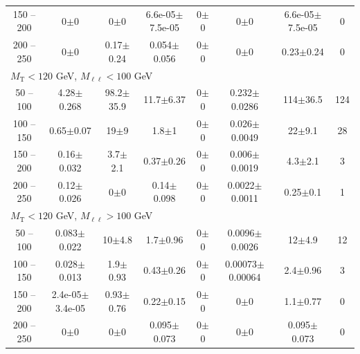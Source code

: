 \begin{landscape}
\begin{table}
\begin{center}
\begin{tabular}{| c | c c c c c c  c | }
150 -- 200&0$\pm$0&0$\pm$0&6.6e-05$\pm$7.5e-05&0$\pm$0&0$\pm$0&6.6e-05$\pm$7.5e-05&0\\
200 -- 250&0$\pm$0&0.17$\pm$0.24&0.054$\pm$0.056&0$\pm$0&0$\pm$0&0.23$\pm$0.24&0\\
\hline\hline
\multicolumn{8}{l}{$M_{\text{T}} < 120$ GeV, $M_{\ell\ell} < 100$ GeV}\\\hline\hline
50 -- 100&4.28$\pm$0.268&98.2$\pm$35.9&11.7$\pm$6.37&0$\pm$0&0.232$\pm$0.0286&114$\pm$36.5&124\\
100 -- 150&0.65$\pm$0.07&19$\pm$9&1.8$\pm$1&0$\pm$0&0.026$\pm$0.0049&22$\pm$9.1&28\\
150 -- 200&0.16$\pm$0.032&3.7$\pm$2.1&0.37$\pm$0.26&0$\pm$0&0.006$\pm$0.0019&4.3$\pm$2.1&3\\
200 -- 250&0.12$\pm$0.026&0$\pm$0&0.14$\pm$0.098&0$\pm$0&0.0022$\pm$0.0011&0.25$\pm$0.1&1\\
\hline\hline
\multicolumn{8}{l}{$M_{\text{T}} < 120$ GeV, $M_{\ell\ell} > 100$ GeV}\\\hline\hline
50 -- 100&0.083$\pm$0.022&10$\pm$4.8&1.7$\pm$0.96&0$\pm$0&0.0096$\pm$0.0026&12$\pm$4.9&12\\
100 -- 150&0.028$\pm$0.013&1.9$\pm$0.93&0.43$\pm$0.26&0$\pm$0&0.00073$\pm$0.00064&2.4$\pm$0.96&3\\
150 -- 200&2.4e-05$\pm$3.4e-05&0.93$\pm$0.76&0.22$\pm$0.15&0$\pm$0&0$\pm$0&1.1$\pm$0.77&0\\
200 -- 250&0$\pm$0&0$\pm$0&0.095$\pm$0.073&0$\pm$0&0$\pm$0&0.095$\pm$0.073&0\\
\hline\hline
\end{tabular}
\end{center}
\end{table}
\end{landscape}
